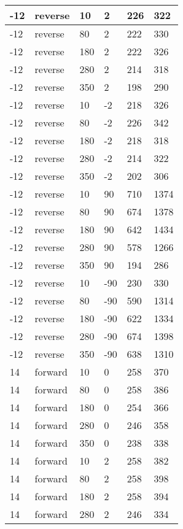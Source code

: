\begin{longtable}{|l|l|l|l|l|l|}
			\hline
			-12 & reverse & 10 & 2 & 226 & 322 \\
			\hline
			-12 & reverse & 80 & 2 & 222 & 330 \\
			\hline
			-12 & reverse & 180 & 2 & 222 & 326 \\
			\hline
			-12 & reverse & 280 & 2 & 214 & 318 \\
			\hline
			-12 & reverse & 350 & 2 & 198 & 290 \\
			\hline
			-12 & reverse & 10 & -2 & 218 & 326 \\
			\hline
			-12 & reverse & 80 & -2 & 226 & 342 \\
			\hline
			-12 & reverse & 180 & -2 & 218 & 318 \\
			\hline
			-12 & reverse & 280 & -2 & 214 & 322 \\
			\hline
			-12 & reverse & 350 & -2 & 202 & 306 \\
			\hline
			-12 & reverse & 10 & 90 & 710 & 1374 \\
			\hline
			-12 & reverse & 80 & 90 & 674 & 1378 \\
			\hline
			-12 & reverse & 180 & 90 & 642 & 1434 \\
			\hline
			-12 & reverse & 280 & 90 & 578 & 1266 \\
			\hline
			-12 & reverse & 350 & 90 & 194 & 286 \\
			\hline
			-12 & reverse & 10 & -90 & 230 & 330 \\
			\hline
			-12 & reverse & 80 & -90 & 590 & 1314 \\
			\hline
			-12 & reverse & 180 & -90 & 622 & 1334 \\
			\hline
			-12 & reverse & 280 & -90 & 674 & 1398 \\
			\hline
			-12 & reverse & 350 & -90 & 638 & 1310 \\
			\hline
			14 & forward & 10 & 0 & 258 & 370 \\
			\hline
			14 & forward & 80 & 0 & 258 & 386 \\
			\hline
			14 & forward & 180 & 0 & 254 & 366 \\
			\hline
			14 & forward & 280 & 0 & 246 & 358 \\
			\hline
			14 & forward & 350 & 0 & 238 & 338 \\
			\hline
			14 & forward & 10 & 2 & 258 & 382 \\
			\hline
			14 & forward & 80 & 2 & 258 & 398 \\
			\hline
			14 & forward & 180 & 2 & 258 & 394 \\
			\hline
			14 & forward & 280 & 2 & 246 & 334 \\

\end{longtable}
